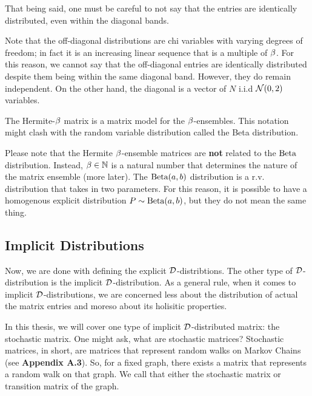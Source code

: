 That being said, one must be careful to not say that the entries are identically distributed, even within the diagonal bands.

\begin{remark}
Note that the off-diagonal distributions are chi variables with varying degrees of freedom; in fact it is an increasing linear sequence that is a multiple of $\b$.
For this reason, we cannot say that the off-diagonal entries are identically distributed despite them being within the same diagonal band. However, they do remain independent.
On the other hand, the diagonal is a vector of $N$ i.i.d $\mathcal{N}(0,2)$ variables.
\end{remark}

The Hermite-$\b$ matrix is a matrix model for the $\b$-ensembles. This notation might clash with the random variable distribution called the Beta distribution.

\begin{warning}[$\b$-Notation]
Please note that the Hermite $\b$-ensemble matrices are \textbf{not} related to the $\text{Beta}$ distribution.
Instead, $\beta \in \mathbb{N}$ is a natural number that determines the nature of the matrix ensemble (more later). The $\text{Beta}(a,b)$ distribution is a r.v. distribution that
takes in two parameters. For this reason, it is possible to have a homogenous explicit distribution $P \sim \text{Beta}(a,b)$, but they do not mean the same thing.
\end{warning}


\newpage
\subsection{Implicit Distributions}

Now, we are done with defining the explicit $\mathcal{D}$-distribtions. The other type of $\mathcal{D}$-distribution is the implicit $\mathcal{D}$-distribution.
As a general rule, when it comes to implicit $\mathcal{D}$-distributions, we are concerned less about the distribution of actual the matrix entries and moreso about its holisitic properties.

In this thesis, we will cover one type of implicit $\mathcal{D}$-distributed matrix: the stochastic matrix. One might ask, what are stochastic matrices?
Stochastic matrices, in short, are matrices that represent random walks on Markov Chains (see \textbf{Appendix A.3}). So, for a fixed graph, there exists a matrix that represents a random walk on that graph.
We call that either the stochastic matrix or transition matrix of the graph.

